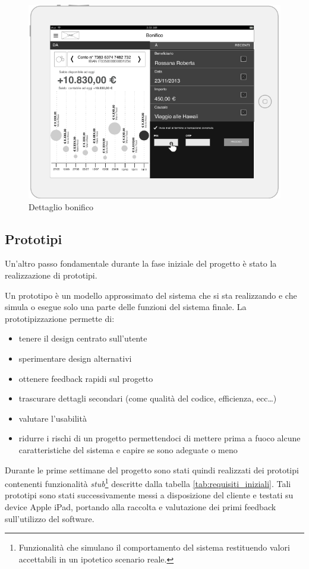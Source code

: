 \begin{figure}[!htbp]
\centering
\includegraphics[scale=1.0]{primo_wireframe/bonifico2.png}
\caption{Dettaglio bonifico}
\end{figure}

\newpage
\subsection{Prototipi}
Un'altro passo fondamentale durante la fase iniziale del progetto è stato la realizzazione di prototipi.

Un prototipo è un modello approssimato del sistema che si sta realizzando e che simula o esegue solo una parte delle funzioni del sistema finale.
La prototipizzazione permette di:

\begin{itemize}
  \item tenere il design centrato sull’utente 
  \item sperimentare design alternativi
  \item ottenere feedback rapidi sul progetto
  \item trascurare dettagli secondari (come qualità del codice, efficienza, ecc\dots) 
  \item valutare l'usabilità
  \item ridurre i rischi di un progetto permettendoci di mettere prima a fuoco alcune caratteristiche del sistema e capire se sono adeguate o meno
\end{itemize}

Durante le prime settimane del progetto sono stati quindi realizzati dei prototipi contenenti funzionalità \emph{stub}\footnote{Funzionalità che simulano il comportamento  del sistema restituendo valori accettabili in un ipotetico scenario reale.} descritte dalla tabella \ref{tab:requisiti_iniziali}. Tali prototipi sono stati successivamente messi a disposizione del cliente e testati su device Apple iPad, portando alla raccolta e valutazione dei primi feedback sull'utilizzo del software.
